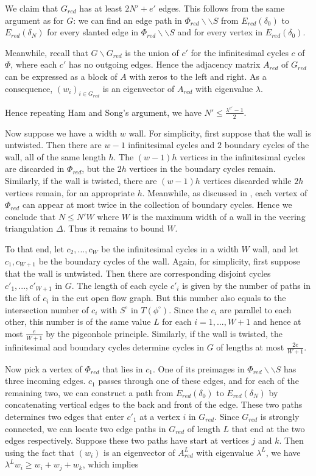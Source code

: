 \documentclass[12pt]{amsart}
\theoremstyle{definition}
\numberwithin{equation}{section}
\begin{document}
We claim that $G_{red}$ has at least $2N'+e'$ edges. This follows from the same argument as for $G$: we can find an edge path in $\Phi_{red} \backslash \backslash S$ from $E_{red}(\delta_0)$ to $E_{red}(\delta_N)$ for every slanted edge in $\Phi_{red} \backslash \backslash S$ and for every vertex in $E_{red}(\delta_0)$.

Meanwhile, recall that $G \backslash G_{red}$ is the union of $c'$ for the infinitesimal cycles $c$ of $\Phi$, where each $c'$ has no outgoing edges. Hence the adjacency matrix $A_{red}$ of $G_{red}$ can be expressed as a block of $A$ with zeros to the left and right. As a consequence, $(w_i)_{i \in G_{red}}$ is an eigenvector of $A_{red}$ with eigenvalue $\lambda$. 

Hence repeating Ham and Song's argument, we have $N' \leq \frac{\lambda^{e'}-1}{2}$.

Now suppose we have a width $w$ wall. For simplicity, first suppose that the wall is untwisted. Then there are $w-1$ infinitesimal cycles and $2$ boundary cycles of the wall, all of the same length $h$. The $(w-1)h$ vertices in the infinitesimal cycles are discarded in $\Phi_{red}$, but the $2h$ vertices in the boundary cycles remain. Similarly, if the wall is twisted, there are $(w-1)h$ vertices discarded while $2h$ vertices remain, for an appropriate $h$. Meanwhile, as discussed in , each vertex of $\Phi_{red}$ can appear at most twice in the collection of boundary cycles. Hence we conclude that $N \leq N'W$ where $W$ is the maximum width of a wall in the veering triangulation $\Delta$. Thus it remains to bound $W$.

To that end, let $c_2,...,c_W$ be the infinitesimal cycles in a width $W$ wall, and let $c_1,c_{W+1}$ be the boundary cycles of the wall. Again, for simplicity, first suppose that the wall is untwisted. Then there are corresponding disjoint cycles $c'_1,...,c'_{W+1}$ in $G$. The length of each cycle $c'_i$ is given by the number of paths in the lift of $c_i$ in the cut open flow graph. But this number also equals to the intersection number of $c_i$ with $S^\circ$ in $T(\phi^\circ)$. Since the $c_i$ are parallel to each other, this number is of the same value $L$ for each $i=1,...,W+1$ and hence at most $\frac{e}{W+1}$ by the pigeonhole principle. Similarly, if the wall is twisted, the infinitesimal and boundary cycles determine cycles in $G$ of lengths at most $\frac{2e}{W+1}$.

Now pick a vertex of $\Phi_{red}$ that lies in $c_1$. One of its preimages in $\Phi_{red} \backslash \backslash S$ has three incoming edges. $c_1$ passes through one of these edges, and for each of the remaining two, we can construct a path from $E_{red}(\delta_0)$ to $E_{red}(\delta_N)$ by concatenating vertical edges to the back and front of the edge. These two paths determines two edges that enter $c'_1$ at a vertex $i$ in $G_{red}$. Since $G_{red}$ is strongly connected, we can locate two edge paths in $G_{red}$ of length $L$ that end at the two edges respectively. Suppose these two paths have start at vertices $j$ and $k$. Then using the fact that $(w_i)$ is an eigenvector of $A^L_{red}$ with eigenvalue $\lambda^L$, we have $\lambda^L w_i \geq w_i + w_j + w_k$, which implies 
\end{document}
